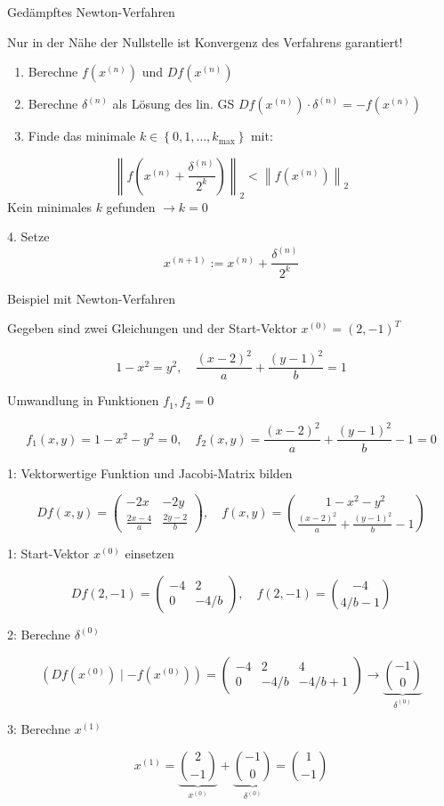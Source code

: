 \begin{corollary}{Gedämpftes Newton-Verfahren}

Nur in der Nähe der Nullstelle ist Konvergenz des Verfahrens garantiert!
\begin{enumerate}
    \item Berechne $f\left(x^{(n)}\right)$ und $D f\left(x^{(n)}\right)$
    \item Berechne $\delta^{(n)}$ als Lösung des lin. GS $D f\left(x^{(n)}\right) \cdot \delta^{(n)}=-f\left(x^{(n)}\right)$
    \item Finde das minimale $k \in\left\{0,1, \ldots, k_{\max }\right\}$ mit:
\end{enumerate}
$$
\left\|f\left(x^{(n)}+\frac{\delta^{(n)}}{2^k}\right)\right\|_2<\left\|f\left(x^{(n)}\right)\right\|_2
$$
Kein minimales $k$ gefunden $\rightarrow k=0$

4. Setze
$$
x^{(n+1)}:=x^{(n)}+\frac{\delta^{(n)}}{2^k}
$$
\end{corollary}


\begin{example2}{Beispiel mit Newton-Verfahren}
    
Gegeben sind zwei Gleichungen und der Start-Vektor $x^{(0)}=(2,-1)^T$

$$
1-x^2=y^2, \quad \frac{(x-2)^2}{a}+\frac{(y-1)^2}{b}=1
$$


Umwandlung in Funktionen $f_1, f_2=0$

$$
f_1(x, y)=1-x^2-y^2=0, \quad f_2(x, y)=\frac{(x-2)^2}{a}+\frac{(y-1)^2}{b}-1=0
$$


1: Vektorwertige Funktion und Jacobi-Matrix bilden

$$
D f(x, y)=\left(\begin{array}{cc}
-2 x & -2 y \\
\frac{2 x-4}{a} & \frac{2 y-2}{b}
\end{array}\right), \quad f(x, y)=\binom{1-x^2-y^2}{\frac{(x-2)^2}{a}+\frac{(y-1)^2}{b}-1}
$$


1: Start-Vektor $x^{(0)}$ einsetzen

$$
D f(2,-1)=\left(\begin{array}{cc}
-4 & 2 \\
0 & -4 / b
\end{array}\right), \quad f(2,-1)=\binom{-4}{4 / b-1}
$$


2: Berechne $\delta^{(0)}$

$$
\left(D f\left(x^{(0)}\right) \mid-f\left(x^{(0)}\right)\right)=\left(\begin{array}{cc|c}
-4 & 2 & 4 \\
0 & -4 / b & -4 / b+1
\end{array}\right) \rightarrow \underbrace{\binom{-1}{0}}_{\delta^{(0)}}
$$


3: Berechne $x^{(1)}$

$$
x^{(1)}=\underbrace{\binom{2}{-1}}_{x^{(0)}}+\underbrace{\binom{-1}{0}}_{\delta^{(0)}}=\binom{1}{-1}
$$
\end{example2}

